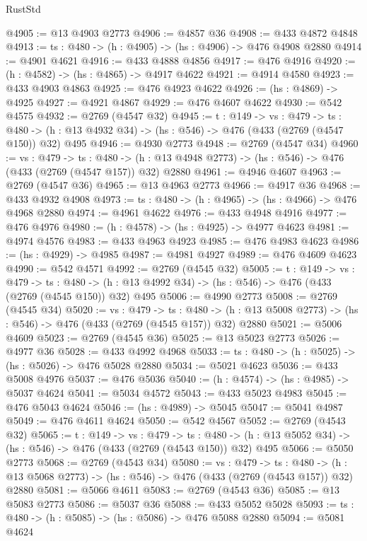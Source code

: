 \begin{lexlean}{RustStd}
\begin{coremodule}
@4905 := @13 @4903 @2773
@4906 := @4857 @36
@4908 := @433 @4872 @4848
@4913 := {ts : @480} -> (h : @4905) -> (hs : @4906) -> @476 @4908 @2880
@4914 := @4901 @4621
@4916 := @433 @4888 @4856
@4917 := @476 @4916
@4920 := (h : @4582) -> (hs : @4865) -> @4917 @4622
@4921 := @4914 @4580
@4923 := @433 @4903 @4863
@4925 := @476 @4923 @4622
@4926 := (hs : @4869) -> @4925
@4927 := @4921 @4867
@4929 := @476 @4607 @4622
@4930 := @542 @4575
@4932 := @2769 (@4547 @32)
@4945 := {t : @149} ->
  {vs : @479} ->
  {ts : @480} -> (h : @13 @4932 @34) -> (hs : @546) -> @476 (@433 (@2769 (@4547 @150)) @32) @495
@4946 := @4930 @2773
@4948 := @2769 (@4547 @34)
@4960 := {vs : @479} ->
  {ts : @480} -> (h : @13 @4948 @2773) -> (hs : @546) -> @476 (@433 (@2769 (@4547 @157)) @32) @2880
@4961 := @4946 @4607
@4963 := @2769 (@4547 @36)
@4965 := @13 @4963 @2773
@4966 := @4917 @36
@4968 := @433 @4932 @4908
@4973 := {ts : @480} -> (h : @4965) -> (hs : @4966) -> @476 @4968 @2880
@4974 := @4961 @4622
@4976 := @433 @4948 @4916
@4977 := @476 @4976
@4980 := (h : @4578) -> (hs : @4925) -> @4977 @4623
@4981 := @4974 @4576
@4983 := @433 @4963 @4923
@4985 := @476 @4983 @4623
@4986 := (hs : @4929) -> @4985
@4987 := @4981 @4927
@4989 := @476 @4609 @4623
@4990 := @542 @4571
@4992 := @2769 (@4545 @32)
@5005 := {t : @149} ->
  {vs : @479} ->
  {ts : @480} -> (h : @13 @4992 @34) -> (hs : @546) -> @476 (@433 (@2769 (@4545 @150)) @32) @495
@5006 := @4990 @2773
@5008 := @2769 (@4545 @34)
@5020 := {vs : @479} ->
  {ts : @480} -> (h : @13 @5008 @2773) -> (hs : @546) -> @476 (@433 (@2769 (@4545 @157)) @32) @2880
@5021 := @5006 @4609
@5023 := @2769 (@4545 @36)
@5025 := @13 @5023 @2773
@5026 := @4977 @36
@5028 := @433 @4992 @4968
@5033 := {ts : @480} -> (h : @5025) -> (hs : @5026) -> @476 @5028 @2880
@5034 := @5021 @4623
@5036 := @433 @5008 @4976
@5037 := @476 @5036
@5040 := (h : @4574) -> (hs : @4985) -> @5037 @4624
@5041 := @5034 @4572
@5043 := @433 @5023 @4983
@5045 := @476 @5043 @4624
@5046 := (hs : @4989) -> @5045
@5047 := @5041 @4987
@5049 := @476 @4611 @4624
@5050 := @542 @4567
@5052 := @2769 (@4543 @32)
@5065 := {t : @149} ->
  {vs : @479} ->
  {ts : @480} -> (h : @13 @5052 @34) -> (hs : @546) -> @476 (@433 (@2769 (@4543 @150)) @32) @495
@5066 := @5050 @2773
@5068 := @2769 (@4543 @34)
@5080 := {vs : @479} ->
  {ts : @480} -> (h : @13 @5068 @2773) -> (hs : @546) -> @476 (@433 (@2769 (@4543 @157)) @32) @2880
@5081 := @5066 @4611
@5083 := @2769 (@4543 @36)
@5085 := @13 @5083 @2773
@5086 := @5037 @36
@5088 := @433 @5052 @5028
@5093 := {ts : @480} -> (h : @5085) -> (hs : @5086) -> @476 @5088 @2880
@5094 := @5081 @4624

\end{coremodule}
\end{lexlean}
